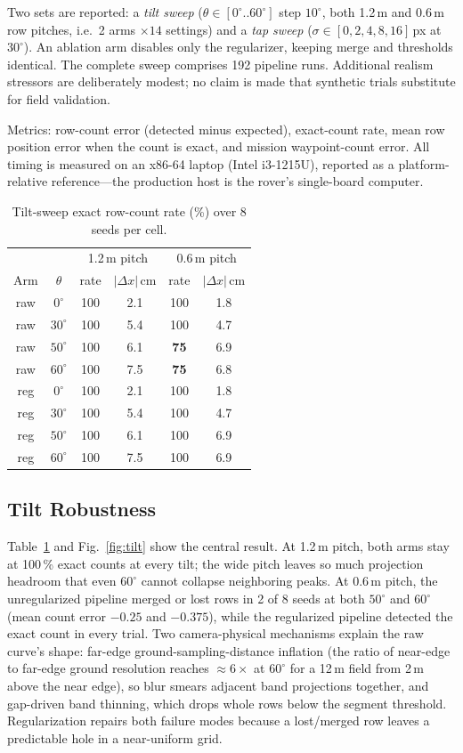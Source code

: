 \documentclass[conference]{IEEEtran}
\begin{document}
Two sets are reported: a \emph{tilt sweep} ($\theta \in
[0^\circ..60^\circ]$ step $10^\circ$, both 1.2\,m and 0.6\,m row pitches,
i.e.\ 2 arms $\times14$ settings) and a \emph{tap sweep} ($\sigma \in
[0,2,4,8,16]$\,px at $30^\circ$). An ablation arm disables only the
regularizer, keeping merge and thresholds identical. The complete sweep
comprises 192 pipeline runs. Additional realism stressors are deliberately
modest; no claim is made that synthetic trials substitute for field
validation.

Metrics: row-count error (detected minus expected), exact-count rate, mean
row position error when the count is exact, and mission waypoint-count error.
All timing is measured on an x86-64 laptop (Intel i3-1215U), reported as a
platform-relative reference---the production host is the rover's
single-board computer.

\begin{table}[t]
\caption{Tilt-sweep exact row-count rate (\%) over 8 seeds per cell.}
\label{tab:tilt}
\centering
\begin{tabular}{@{}cc|cc|cc@{}}
\hline
 & & \multicolumn{2}{c|}{1.2\,m pitch} &
   \multicolumn{2}{c}{0.6\,m pitch}\\
Arm & $\theta$ & rate & $|\Delta x|$\,cm & rate & $|\Delta x|$\,cm\\
\hline
raw & $0^\circ$ & 100 & 2.1 & 100 & 1.8\\
raw & $30^\circ$ & 100 & 5.4 & 100 & 4.7\\
raw & $50^\circ$ & 100 & 6.1 & \textbf{75} & 6.9\\
raw & $60^\circ$ & 100 & 7.5 & \textbf{75} & 6.8\\
reg & $0^\circ$ & 100 & 2.1 & 100 & 1.8\\
reg & $30^\circ$ & 100 & 5.4 & 100 & 4.7\\
reg & $50^\circ$ & 100 & 6.1 & 100 & 6.9\\
reg & $60^\circ$ & 100 & 7.5 & 100 & 6.9\\
\hline
\end{tabular}
\end{table}

\subsection{Tilt Robustness}
Table~\ref{tab:tilt} and Fig.~\ref{fig:tilt} show the central result. At
1.2\,m pitch, both arms stay at 100\,\% exact counts at every tilt; the wide
pitch leaves so much projection headroom that even $60^\circ$ cannot collapse
neighboring peaks. At 0.6\,m pitch, the unregularized pipeline merged or lost
rows in 2 of 8 seeds at both $50^\circ$ and $60^\circ$ (mean count error
$-0.25$ and $-0.375$), while the regularized pipeline detected the exact
count in every trial. Two camera-physical mechanisms explain the raw curve's
shape: far-edge ground-sampling-distance inflation (the ratio of near-edge to
far-edge ground resolution reaches $\approx6\times$ at $60^\circ$ for a
12\,m field from 2\,m above the near edge), so blur smears adjacent band
projections together, and gap-driven band thinning, which drops whole rows
below the segment threshold. Regularization repairs both failure modes because
a lost/merged row leaves a predictable hole in a near-uniform grid.
\end{document}
